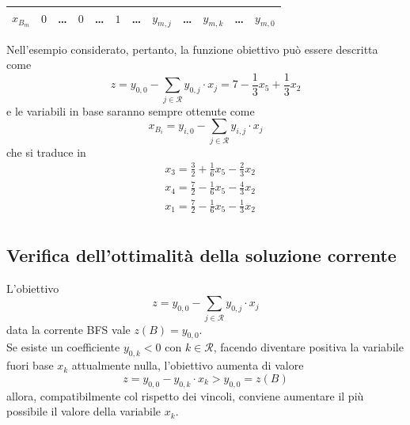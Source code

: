 \documentclass[a4paper]{extarticle}
\begin{document}
\begin{table}[H]
\begin{tabular}{|c|ccccc|ccccc|c|}
        \cellcolor{red!25!white}$x_{B_m}$ & \cellcolor{red!50!white}$0$ & \cellcolor{red!50!white}\dots & \cellcolor{red!50!white}$0$ & \cellcolor{red!50!white}\dots & \cellcolor{red!50!white}$1$ & \cellcolor{blue!50!white}\dots & \cellcolor{blue!50!white}$y_{m,j}$ & \cellcolor{blue!50!white}\dots & \cellcolor{blue!50!white}$y_{m,k}$ & \cellcolor{blue!50!white}\dots & \cellcolor{orange!25!white}$y_{m,0}$\\
        \hline
    \end{tabular}
\end{table}

\vspace{1em}
\noindent
Nell'esempio considerato, pertanto, la funzione obiettivo può essere descritta come
\[z=y_{0,0}-\sum_{j \in \mathcal{R}} y_{0,j} \cdot x_j = 7 - \frac{1}{3}x_5+\frac{1}{3}x_2\]
e le variabili in base saranno sempre ottenute come
\[x_{B_i}=y_{i,0}-\sum_{j \in \mathcal{R}} y_{i,j} \cdot x_j\]
che si traduce in
\begin{align*}
    &x_3=\frac{3}{2}+\frac{1}{6}x_5-\frac{2}{3}x_2\\
    &x_4=\frac{7}{2}-\frac{1}{6}x_5-\frac{4}{3}x_2\\
    &x_1=\frac{7}{2}-\frac{1}{6}x_5-\frac{1}{3}x_2\\
\end{align*}

\vspace{1em}
\noindent
\subsection{Verifica dell'ottimalità della soluzione corrente}
L'obiettivo
\[z=y_{0,0} - \sum_{j \in \mathcal{R}} y_{0,j} \cdot x_j\]
data la corrente BFS vale $z(B) = y_{0,0}$.\\
Se esiste un coefficiente $y_{0,k} < 0$ con $k \in \mathcal{R}$, facendo diventare positiva la variabile fuori base $x_k$ attualmente nulla, l'obiettivo aumenta di valore
\[z = y_{0,0} - y_{0,k} \cdot x_k > y_{0,0} = z(B)\]
allora, compatibilmente col rispetto dei vincoli, conviene aumentare il più possibile il valore della variabile $x_k$.

\vspace{1em}
\noindent
\end{document}
